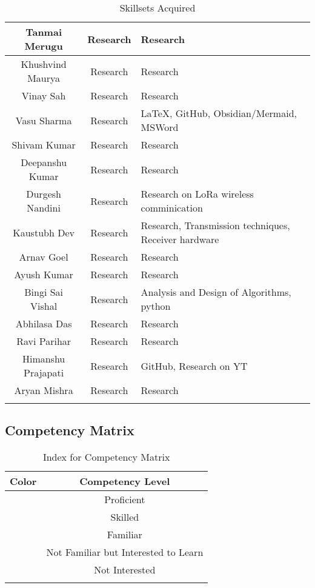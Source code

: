 \begin{center}
\begin{longtable}{ | c | c | m{6cm} | }
        \hline 
        Tanmai Merugu & Research & Research\\ 
        \hline 
        Khushvind Maurya & Research & Research\\ 
        \hline 
        Vinay Sah & Research & Research\\ 
        \hline 
        Vasu Sharma & Research & LaTeX, GitHub, Obsidian/Mermaid, MSWord\\ 
        \hline 
        Shivam Kumar & Research & Research\\ 
        \hline 
        Deepanshu Kumar & Research & Research\\ 
        \hline 
        Durgesh Nandini & Research & Research on LoRa wireless comminication\\ 
        \hline 
        Kaustubh Dev & Research & Research, Transmission techniques, Receiver hardware\\ 
        \hline 
        Arnav Goel & Research & Research\\ 
        \hline 
        Ayush Kumar & Research & Research\\ 
        \hline 
        Bingi Sai Vishal & Research & Analysis and Design of Algorithms, python\\ 
        \hline 
        Abhilasa Das & Research & Research\\ 
        \hline 
        Ravi Parihar & Research & Research\\ 
        \hline 
        Himanshu Prajapati & Research & GitHub, Research on YT\\ 
        \hline 
        Aryan Mishra & Research & Research\\ 
        \hline 

        \hline
        \caption{Skillsets Acquired}
    \end{longtable}
\end{center}

\newpage
\subsection{Competency Matrix}


\begin{center}
\label{table:index_for_competency}
\begin{longtable}{|c|c|} \hline
Color                    & Competency Level                     \\ \hline
\cellcolor[HTML]{00B050}            & Proficient \\ \hline
\cellcolor[HTML]{92D050}            & Skilled \\ \hline
\cellcolor[HTML]{FFFF00}            & Familiar \\ \hline
\cellcolor[HTML]{FFC000}            & Not Familiar but Interested to Learn \\ \hline
\cellcolor[HTML]{D9D9D9}            & Not Interested \\ \hline
\caption{Index for Competency Matrix}
\end{longtable}
\end{center}


